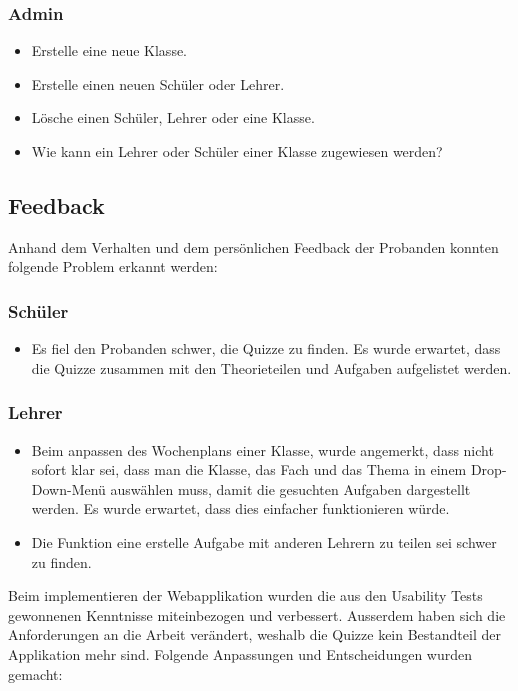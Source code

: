 \subsubsection*{Admin}
\begin{itemize}
	\item Erstelle eine neue Klasse.
	\item Erstelle einen neuen Schüler oder Lehrer.
	\item Lösche einen Schüler, Lehrer oder eine Klasse.
	\item Wie kann ein Lehrer oder Schüler einer Klasse zugewiesen werden?
\end{itemize} 

\subsection*{Feedback}
Anhand dem Verhalten und dem persönlichen Feedback der Probanden konnten folgende Problem erkannt werden:

\subsubsection*{Schüler}
\begin{itemize}
	\item Es fiel den Probanden schwer, die Quizze zu finden. Es wurde erwartet, dass die Quizze zusammen mit den Theorieteilen und Aufgaben aufgelistet werden.
\end{itemize}

\subsubsection*{Lehrer}
\begin{itemize}
	\item Beim anpassen des Wochenplans einer Klasse, wurde angemerkt, dass nicht sofort klar sei, dass man die Klasse, das Fach und das Thema in einem Drop-Down-Menü auswählen muss, damit die gesuchten Aufgaben dargestellt werden. Es wurde erwartet, dass dies einfacher funktionieren würde.
	\item Die Funktion eine erstelle Aufgabe mit anderen Lehrern zu teilen sei schwer zu finden.
\end{itemize}

Beim implementieren der Webapplikation wurden die aus den Usability Tests gewonnenen Kenntnisse miteinbezogen und verbessert. Ausserdem haben sich die Anforderungen an die Arbeit verändert, weshalb die Quizze kein Bestandteil der Applikation mehr sind. Folgende Anpassungen und Entscheidungen wurden gemacht: \\

